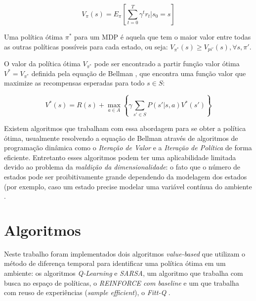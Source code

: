 \documentclass[letterpaper]{article}
\begin{document}
\begin{equation} \label{eq:total_expected_reward}
    V_\pi(s) = E_{\pi} \left[ \sum_{t=0}^{T} \gamma^t r_t | s_0 = s \right]
\end{equation}

Uma política ótima $\pi^*$ para um MDP é aquela que tem o maior valor entre todas as outras políticas possíveis para cada estado, 
ou seja: $V_{\pi^*}(s) \geq V_{pi'}(s), \forall s,\pi'$.

O valor da política ótima $V_{\pi^*}$ pode ser encontrado a partir função valor ótima $V^* = V_{\pi^*}$ definida pela equação de Bellman \cite{Bellman-1966}, 
que encontra uma função valor que maximize as recompensas esperadas para todo $s \in S$:

\begin{equation} \label{eq:bellman_equation}
    V^*(s) = R(s) + \max_{a \in A} \left\{ \gamma \sum_{s'\in S} P(s'|s,a)V^*(s') \right\}
\end{equation}

Existem algoritmos que trabalham com essa abordagem para se obter a política ótima, usualmente resolvendo a equação de Bellman através de algoritmos de
programação dinâmica como o \textit{Iteração de Valor} e a \textit{Iteração de Política} \cite{Howard-1960} de forma eficiente. Entretanto esses algoritmos podem ter uma 
aplicabilidade limitada devido ao problema da \textit{maldição da dimensionalidade}: o fato que o número de estados pode ser proibitivamente grande dependendo
da modelagem dos estados (por exemplo, caso um estado precise modelar uma variável contínua do ambiente \cite{SuttonBarto-2018}. 





\section{Algoritmos}

Neste trabalho foram implementados dois algoritmos \textit{value-based} que utilizam o método de diferença temporal para identificar 
uma política ótima em um ambiente: os algoritmos \textit{Q-Learning} \cite{Watkins-Dayan-1992} e \textit{SARSA}, um algoritmo que trabalha com busca no 
espaço de políticas, o \textit{REINFORCE com baseline} e um que trabalha com reuso de experiências (\textit{sample efficient}), o \textit{Fitt-Q} \cite{Riedmiller-2005}.
\end{document}
